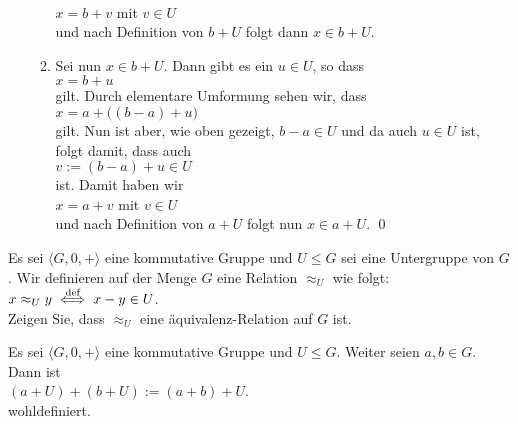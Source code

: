 \begin{enumerate}
\begin{enumerate}
        \\[0.2cm]
        \hspace*{1.3cm}
        $x = b + v$ mit $v \in U$
        \\[0.2cm]
        und nach Definition von $b + U$ folgt dann $x \in b + U$.
  \item Sei nun $x \in b + U$.  Dann gibt es ein $u \in U$, so dass
        \\[0.2cm]
        \hspace*{1.3cm}
        $x = b + u$
        \\[0.2cm]
        gilt.  Durch elementare Umformung sehen wir, dass
        \\[0.2cm]
        \hspace*{1.3cm}
        $x = a + \bigl((b - a) + u\bigr)$
        \\[0.2cm]
        gilt. Nun ist aber, wie oben gezeigt, $b - a \in U$ und da auch $u \in U$ ist, folgt damit, dass auch
        \\[0.2cm]
        \hspace*{1.3cm}
        $v := (b - a) + u \in U$
        \\[0.2cm]
        ist.  Damit haben wir
        \\[0.2cm]
        \hspace*{1.3cm}
        $x = a + v$ mit $v \in U$
        \\[0.2cm]
        und nach Definition von $a + U$ folgt nun $x \in a + U$. \qed
  \end{enumerate}
\end{enumerate}

\exercise
Es sei $\langle G, 0, + \rangle$ eine kommutative Gruppe und $U \leq G$ sei eine
Untergruppe von $G$.   Wir definieren auf der Menge $G$ eine Relation $\approx_U$ wie folgt:
\\[0.2cm]
\hspace*{1.3cm}
$x \approx_U y \;\stackrel{\mbox{\scriptsize def}}{\Longleftrightarrow}\; x - y \in U$.
\\[0.2cm]
Zeigen Sie, dass $\approx_U$ eine \"{a}quivalenz-Relation auf $G$ ist.
\exend

\begin{Lemma}
  Es sei $\langle G, 0, + \rangle$ eine kommutative Gruppe und $U \leq G$.
  Weiter seien $a,b \in G$.  Dann ist 
  \\[0.2cm]
  \hspace*{1.3cm}
  $(a + U) + (b + U) := (a + b) + U$.
  \\[0.2cm]
  wohldefiniert.
\end{Lemma}

